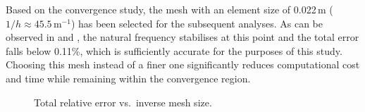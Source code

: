 Based on the convergence study, the mesh with an element size of 0.022\,m ($1/h \approx 45.5$\,m$^{-1}$) has been selected for the subsequent analyses. As can be observed in  and , the natural frequency stabilises at this point and the total error falls below 0.11\%, which is sufficiently accurate for the purposes of this study. Choosing this mesh instead of a finer one significantly reduces computational cost and time while remaining within the convergence region.

\begin{figure}[H]
    \centering
    
    \caption{Total relative error vs.\ inverse mesh size.}
    \label{fig:convergence_error_total}
\end{figure}
